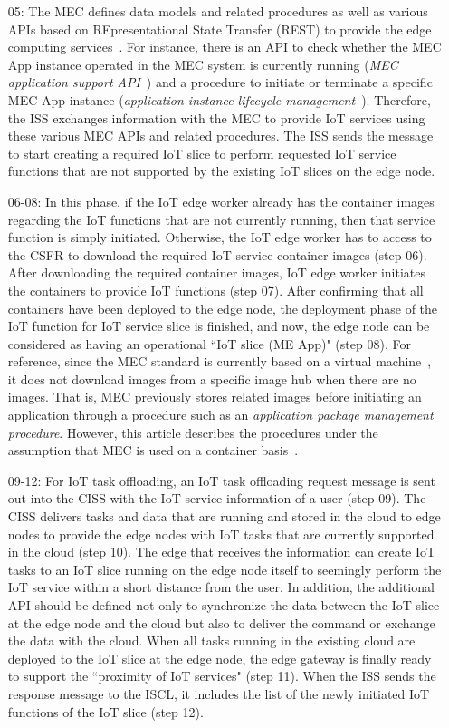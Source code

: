 \begin{enumerate}
\item [05:] The MEC defines data models and related procedures as well as various APIs based on REpresentational State Transfer (REST) to provide the edge computing services~\cite{sabella2019developing}. 
For instance, there is an API to check whether the MEC App instance operated in the MEC system is currently running (\textit{MEC application support API}~\cite{computing2019enablement}) and a procedure to initiate or terminate a specific MEC App instance (\textit{application instance lifecycle management}~\cite{computing2019management}).
Therefore, the ISS exchanges information with the MEC to provide IoT services using these various MEC APIs and related procedures.
The ISS sends the message to start creating a required IoT slice to perform requested IoT service functions that are not supported by the existing IoT slices on the edge node.

\item [06-08:] In this phase, if the IoT edge worker already has the container images regarding the IoT functions that are not currently running, then that service function is simply initiated.
Otherwise, the IoT edge worker has to access to the CSFR to download the required IoT service container images (step 06). After downloading the required container images, IoT edge worker initiates the containers to provide IoT functions (step 07). After confirming that all containers have been deployed to the edge node, the deployment phase of the IoT function for IoT service slice is finished, and now, the edge node can be considered as having an operational ``IoT slice (ME App)" (step 08). 
For reference, since the MEC standard is currently based on a virtual machine~\cite{computing2019virtualisation}, it does not download images from a specific image hub when there are no images. That is, MEC previously stores related images before initiating an application through a procedure such as an \textit{application package management procedure}. However, this article describes the procedures under the assumption that MEC is used on a container basis~\cite{computing2019management}.

\item [09-12:] For IoT task offloading, an IoT task offloading request message is sent out into the CISS with the IoT service information of a user (step 09). 
The CISS delivers tasks and data that are running and stored in the cloud to edge nodes to provide the edge nodes with IoT tasks that are currently supported in the cloud (step 10). 
The edge that receives the information can create IoT tasks to an IoT slice running on the edge node itself to seemingly perform the IoT service within a short distance from the user. 
In addition, the additional API should be defined not only to synchronize the data between the IoT slice at the edge node and the cloud but also to deliver the command or exchange the data with the cloud. 
When all tasks running in the existing cloud are deployed to the IoT slice at the edge node, the edge gateway is finally ready to support the ``proximity of IoT services" (step 11). 
When the ISS sends the response message to the ISCL, it includes the list of the newly initiated IoT functions of the IoT slice (step 12).


\end{enumerate}

